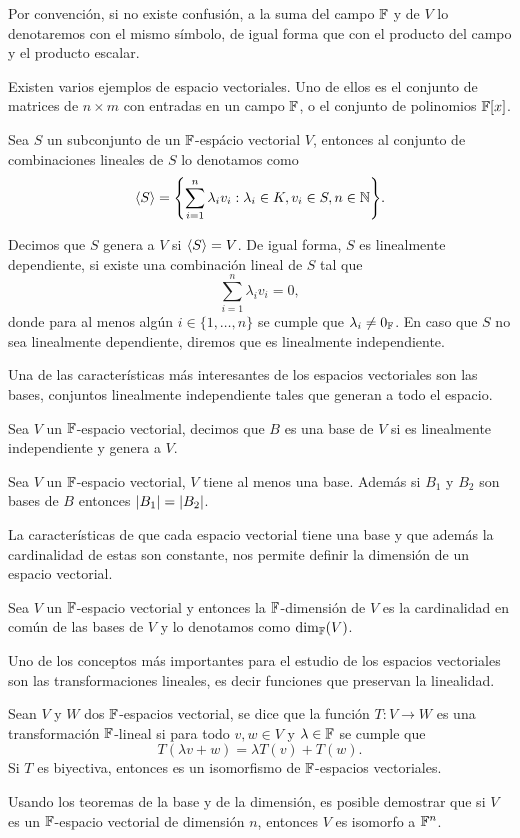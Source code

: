 Por convención, si no existe confusión, a la suma del campo $\mathbb{F}$ y de $V$ lo denotaremos con el mismo símbolo, de igual forma que con el producto del campo y el producto escalar.

Existen varios ejemplos de espacio vectoriales. Uno de ellos es el conjunto de matrices de $n \times m $ con entradas en un campo $\mathbb{F}$, o el conjunto de polinomios $\mathbb{F}[x]$.

\begin{defi}
  Sea $S$ un subconjunto de un $\mathbb{F}$-espácio vectorial $V$, entonces al conjunto de combinaciones lineales de $S$ lo denotamos como
  \[ \inner{S} = \set{ \sum_{i=1}^n \lambda_i v_i : \lambda_i \in K,  v_i \in S, n \in \N  }. \]

  Decimos que $S$ genera a $V$ si $\langle S\rangle = V$. De igual forma, $S$ es linealmente dependiente, si existe una combinación lineal de $S$ tal que
  \[ \sum_{i=1}^n \lambda_i v_i = 0, \]
  donde para al menos algún $i \in \{1,\ldots,n\}$ se cumple que $\lambda_i \neq 0_{\mathbb{F}}$. En caso que $S$ no sea linealmente dependiente, diremos que es linealmente independiente.
\end{defi}

Una de las características más interesantes de los espacios vectoriales son las bases, conjuntos linealmente independiente tales que generan a todo el espacio.
\begin{defi}
  Sea $V$ un $\mathbb{F}$-espacio vectorial, decimos que $B$ es una base de $V$ si es linealmente independiente y genera a $V$.
\end{defi}

\begin{teor}
  Sea $V$ un $\mathbb{F}$-espacio vectorial, $V$ tiene al menos una base. Además si $B_1$ y $B_2$ son bases de $B$ entonces $\mathopen|B_1\mathclose| = \mathopen|B_2\mathclose|$.
\end{teor}

La características de que cada espacio vectorial tiene una base y que además la cardinalidad de estas son constante, nos permite definir la dimensión de un espacio vectorial.

\begin{defi}
  Sea $V$ un $\mathbb{F}$-espacio vectorial y entonces la $\mathbb{F}$-dimensión de $V$ es la cardinalidad en común de las bases de $V$ y lo denotamos como $\dim_{\mathbb{F}}(V)$.
\end{defi}

Uno de los conceptos más importantes para el estudio de los espacios vectoriales son las transformaciones lineales, es decir funciones que preservan la linealidad.

\begin{defi}
  Sean $V$ y $W$ dos $\mathbb{F}$-espacios vectorial, se dice que la función $T\colon V\to W$ es una transformación $\mathbb{F}$-lineal si para todo $v,w \in V$ y $\lambda \in \mathbb{F}$ se cumple que 
  \[ T(\lambda v + w) = \lambda T(v) + T(w).\]
  Si $T$ es biyectiva, entonces es un isomorfismo de $\mathbb{F}$-espacios vectoriales.
\end{defi}

Usando los teoremas de la base y de la dimensión, es posible demostrar que si $V$ es un $\mathbb{F}$-espacio vectorial de dimensión $n$, entonces $V$ es isomorfo a $\mathbb{F}^n$.